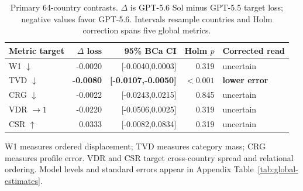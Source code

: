 \begin{table}[!b]
\centering
\caption{Primary 64-country contrasts. $\Delta$ is GPT-5.6 Sol minus GPT-5.5 target loss; negative values favor GPT-5.6. Intervals resample countries and Holm correction spans five global metrics.}
\label{tab:main}
\small
\setlength{\tabcolsep}{4.2pt}
\begin{tabular*}{\linewidth}{@{\extracolsep{\fill}}lrrrl@{}}
\toprule
\rowcolor{tablehead}
Metric target & $\Delta$ loss & 95\% BCa CI & Holm $p$ & Corrected read \\
\midrule
W1 $\downarrow$ & -0.0020 & [-0.0040,0.0003] & 0.319 & uncertain \\
\rowcolor{improvebg}
TVD $\downarrow$ & \textbf{-0.0080} & \textbf{[-0.0107,-0.0050]} & \textbf{$<0.001$} & \textbf{lower error} \\
CRG $\downarrow$ & -0.0022 & [-0.0243,0.0215] & 0.845 & uncertain \\
VDR $\to 1$ & -0.0220 & [-0.0506,0.0025] & 0.319 & uncertain \\
CSR $\uparrow$ & 0.0333 & [-0.0082,0.0834] & 0.319 & uncertain \\
\bottomrule
\end{tabular*}
\vspace{1pt}\parbox{.98\linewidth}{\small W1 measures ordered displacement; TVD measures category mass; CRG measures profile error. VDR and CSR target cross-country spread and relational ordering. Model levels and standard errors appear in Appendix Table~\ref{tab:global-estimates}.}
\end{table}
